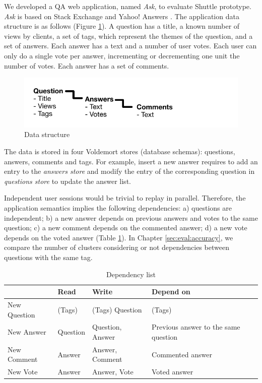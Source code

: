We developed a \ac{QA} web application, named \emph{Ask}, to evaluate Shuttle prototype. \emph{Ask} is based on Stack Exchange \cite{stackexchange} and Yahoo! Answers \cite{yahooAnswers}. The application data structure is as follows (Figure \ref{fig:DataStructure}). A question has a title, a known number of views by clients, a set of tags, which represent the themes of the question, and a set of answers. Each answer has a text and a number of user votes. Each user can only do a single vote per answer, incrementing or decrementing one unit the number of votes. Each answer has a set of comments.

 \begin{figure}
   \centering
   \includegraphics{images/questionStructure}
   \caption{Data structure}
   \label{fig:DataStructure}
 \end{figure}

The data is stored in four Voldemort stores (database schemas): questions, answers, comments and tags. For example, insert a new answer requires to add an entry to the \textit{answers store} and modify the entry of the corresponding question in \textit{questions store} to update the answer list. 

Independent user sessions would be trivial to replay in parallel. Therefore, the application semantics implies the following dependencies: a) questions are independent; b) a new answer depends on previous answers and votes to the same question; c) a new comment depends on the commented answer; d) a new vote depends on the voted answer (Table \ref{tab:dependencyTable}). In Chapter \ref{sec:eval:accuracy}, we compare the number of clusters considering or not dependencies between questions with the same tag.
\begin{table}
  \centering
   \begin{tabular}{l|l|l|l}
    ~             & \textbf{Read}   & \textbf{Write}   & \textbf{Depend on} 					 \\ \hline
    New Question  & (Tags)          & (Tags) Question  & (Tags)                                  \\ \hline
    New Answer    & Question        & Question, Answer & Previous answer to the same question     \\ \hline
    New Comment   & Answer          & Answer, Comment  & Commented answer                            \\ \hline
    New Vote      & Answer          & Answer, Vote     & Voted answer                               \\
    \end{tabular}
    \caption{Dependency list}
    \label{tab:dependencyTable}
\end{table}

